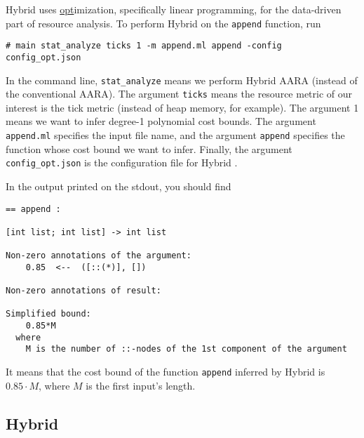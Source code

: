 Hybrid \Opt{} uses \underline{opt}imization, specifically linear programming,
for the data-driven part of resource analysis.
%
To perform Hybrid \Opt{} on the \texttt{append} function, run
\begin{verbatim}
# main stat_analyze ticks 1 -m append.ml append -config config_opt.json
\end{verbatim}
%
In the command line, \texttt{stat\_analyze} means we perform Hybrid AARA
(instead of the conventional AARA).
%
The argument \texttt{ticks} means the resource metric of our interest is the
tick metric (instead of heap memory, for example).
%
The argument 1 means we want to infer degree-1 polynomial cost bounds.
%
The argument \texttt{append.ml} specifies the input file name, and the argument
\texttt{append} specifies the function whose cost bound we want to infer.
%
Finally, the argument \texttt{config\_opt.json} is the configuration file for
Hybrid \Opt{}.

In the output printed on the stdout, you should find
\begin{verbatim}
== append :

[int list; int list] -> int list

Non-zero annotations of the argument:
    0.85  <--  ([::(*)], [])

Non-zero annotations of result:

Simplified bound:
    0.85*M
  where
    M is the number of ::-nodes of the 1st component of the argument
\end{verbatim}
%
It means that the cost bound of the function \texttt{append} inferred by Hybrid
\Opt{} is $0.85 \cdot M$, where $M$ is the first input's length.

\subsection{Hybrid \BayesWC{}}

